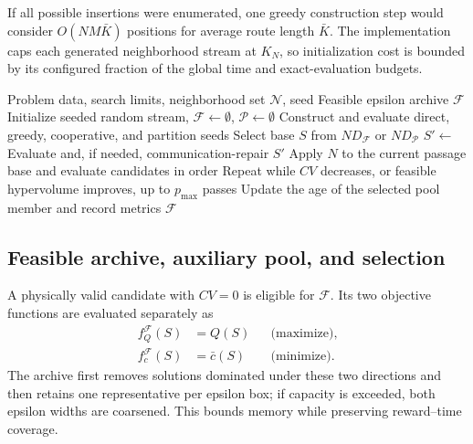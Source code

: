 If all possible insertions were enumerated, one greedy construction step would consider $O(NM\bar K)$ positions for average route length $\bar K$. The implementation caps each generated neighborhood stream at $K_N$, so initialization cost is bounded by its configured fraction of the global time and exact-evaluation budgets.

\begin{algorithm}[t]
\caption{TOP-ICC multi-objective variable-neighborhood search}
\label{alg:movns}
\begin{algorithmic}[1]
\Require Problem data, search limits, neighborhood set $\mathcal N$, seed
\Ensure Feasible epsilon archive $\mathcal F$
\State Initialize seeded random stream, $\mathcal F\gets\emptyset$, $\mathcal P\gets\emptyset$
\State Construct and evaluate direct, greedy, cooperative, and partition seeds
    \State Select base $S$ from $ND_{\mathcal F}$ or $ND_{\mathcal P}$
    \State $S'\gets$ 
    \State Evaluate and, if needed, communication-repair $S'$
        \State Apply $N$ to the current passage base and evaluate candidates in order
        \State Repeat while $CV$ decreases, or feasible hypervolume improves, up to $p_{\max}$ passes
    \EndFor
    \State Update the age of the selected pool member and record metrics
\EndWhile
\State \Return $\mathcal F$
\end{algorithmic}
\end{algorithm}

\subsection{Feasible archive, auxiliary pool, and selection}
A physically valid candidate with $CV=0$ is eligible for $\mathcal F$. Its two objective functions are evaluated separately as
\begin{align}
 f_Q^{\mathcal F}(S)&=Q(S) &&\text{(maximize)},\nonumber\\
 f_c^{\mathcal F}(S)&=\bar c(S) &&\text{(minimize)}.
 \label{eq:archive_objectives}
\end{align}
The archive first removes solutions dominated under these two directions and then retains one representative per epsilon box; if capacity is exceeded, both epsilon widths are coarsened. This bounds memory while preserving reward--time coverage.

